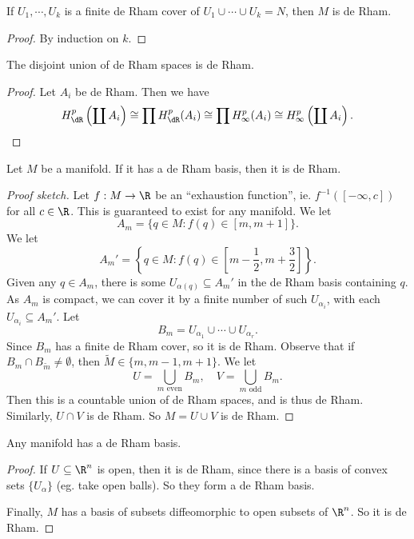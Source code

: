 \documentclass[a4paper]{article}
\begin{document}
\begin{cor}
  If $U_1,\cdots, U_k$ is a finite de Rham cover of $U_1 \cup \cdots \cup U_k = N$, then $M$ is de Rham.
\end{cor}

\begin{proof}
  By induction on $k$.
\end{proof}

\begin{prop}
  The disjoint union of de Rham spaces is de Rham.
\end{prop}

\begin{proof}
  Let $A_i$ be de Rham. Then we have
  \[
    H^p_{\dR}\left(\coprod A_i\right) \cong \prod H^p_{\dR}(A_i) \cong \prod H^p_\infty(A_i) \cong H^p_\infty\left(\coprod A_i\right).
  \]
\end{proof}
\begin{lemma}
  Let $M$ be a manifold. If it has a de Rham basis, then it is de Rham.
\end{lemma}

\begin{proof}[Proof sketch]
  Let $f: M \to \R$ be an ``exhaustion function'', ie. $f^{-1}([-\infty, c])$ for all $c \in \R$. This is guaranteed to exist for any manifold. We let
  \[
    A_m = \{q \in M: f(q) \in [m, m + 1]\}.
  \]
  We let
  \[
    A_m' = \left\{q \in M: f(q) \in \left[m - \frac{1}{2}, m + \frac{3}{2}\right]\right\}.
  \]
  Given any $q \in A_m$, there is some $U_{\alpha(q)} \subseteq A_m'$ in the de Rham basis containing $q$. As $A_m$ is compact, we can cover it by a finite number of such $U_{\alpha_i}$, with each $U_{\alpha_i} \subseteq A_m'$. Let
  \[
    B_m = U_{\alpha_1} \cup \cdots \cup U_{\alpha_r}.
  \]
  Since $B_m$ has a finite de Rham cover, so it is de Rham. Observe that if $B_m \cap B_{\tilde{m}} \not= \emptyset$, then $\tilde{M} \in \{m, m - 1, m + 1\}$. We let
  \[
    U = \bigcup_{m\text{ even}} B_m,\quad V = \bigcup_{m \text{ odd}} B_m.
  \]
  Then this is a countable union of de Rham spaces, and is thus de Rham. Similarly, $U \cap V$ is de Rham. So $M = U \cup V$ is de Rham.
\end{proof}

\begin{thm}
  Any manifold has a de Rham basis.
\end{thm}

\begin{proof}
  If $U \subseteq \R^n$ is open, then it is de Rham, since there is a basis of convex sets $\{U_\alpha\}$ (eg. take open balls). So they form a de Rham basis.

  Finally, $M$ has a basis of subsets diffeomorphic to open subsets of $\R^n$. So it is de Rham.
\end{proof}
\end{document}
